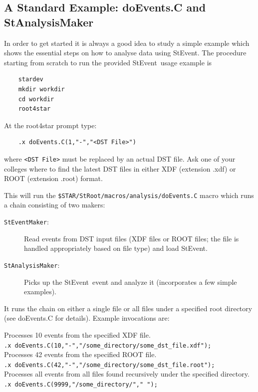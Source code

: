 \documentclass[twoside]{article}
\newcommand{\StEvent}{\textsf{StEvent}}
\begin{document}
\subsection{A Standard Example: doEvents.C and StAnalysisMaker}
\label{sec:doEvents}
  
  

In order to get started it is always a good idea to study a simple
example which shows the essential steps on how to analyse data using
\StEvent.  The procedure starting from scratch to run the provided
\StEvent\ usage example is
\begin{verbatim}
    stardev
    mkdir workdir
    cd workdir
    root4star
\end{verbatim}
At the root4star prompt type:
\begin{verbatim}
    .x doEvents.C(1,"-","<DST File>")
\end{verbatim}
where \texttt{<DST File>} must be replaced by an actual DST file. Ask
one of your colleges where to find the latest DST files in either XDF
(extension .xdf) or ROOT (extension .root) format.

This will run the \texttt{\$STAR/StRoot/macros/analysis/doEvents.C}
macro which runs a chain consisting of two makers:
\begin{description}
\item[\texttt{StEventMaker}:] Read events from DST input files (XDF
    files or ROOT files; the file is handled appropriately based on
    file type) and load \StEvent.
\item[\texttt{StAnalysisMaker}:] Picks up the \StEvent\ event and
    analyze it (incorporates a few simple examples).
\end{description}
It runs the chain on either a single file or all files under a
specified root directory (see doEvents.C for details). Example
invocations are:

Processes 10 events from the specified XDF file.\\
\hspace{1cm}\verb+.x doEvents.C(10,"-","/some_directory/some_dst_file.xdf");+\\

Processes 42 events from the specified ROOT file.\\
\hspace{1cm}\verb+.x doEvents.C(42,"-","/some_directory/some_dst_file.root");+\\

Processes all events from all files found recursively under the
specified directory.\\
\verb+.x doEvents.C(9999,"/some_directory/"," ");+\\
\end{document}
